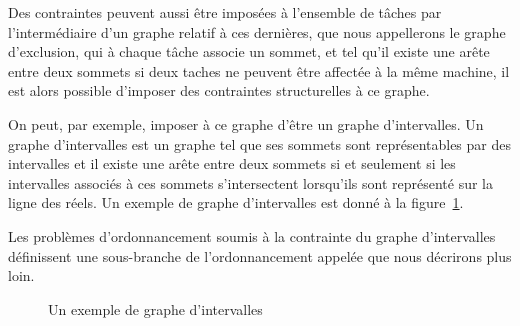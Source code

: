 \documentclass[a4paper,11pt]{report}
\begin{document}
Des contraintes peuvent aussi être imposées à l'ensemble de tâches par l'intermédiaire d'un graphe
relatif à ces dernières, que nous appellerons le graphe d'exclusion, qui à chaque tâche associe
un sommet, et tel qu'il existe une arête entre deux sommets si deux taches ne peuvent être affectée
à la même machine, il est alors possible d'imposer des contraintes structurelles à ce graphe. 

On peut, par exemple, imposer à ce graphe d'être un graphe d'intervalles. Un graphe d'intervalles
est un graphe tel que ses sommets sont représentables par des intervalles et il existe une arête
entre deux sommets si et seulement si les intervalles associés à ces sommets s'intersectent
lorsqu'ils sont représenté sur la ligne des réels. Un exemple de graphe d'intervalles est donné à la
figure~\ref{fig:ex_gint}. 

Les problèmes d'ordonnancement soumis à la contrainte du graphe d'intervalles définissent une
sous-branche de l'ordonnancement appelée \isched{} que nous décrirons plus loin.

\begin{figure}
    \centering
    \caption{Un exemple de graphe d'intervalles}
    \label{fig:ex_gint}
\end{figure}
\end{document}
